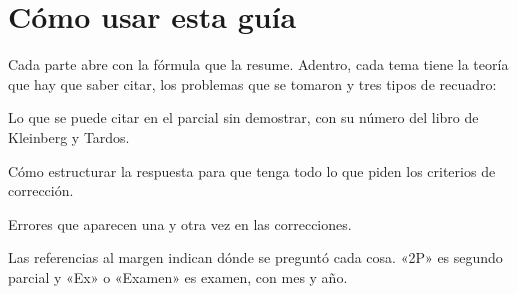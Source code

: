 \section*{Cómo usar esta guía}
Cada parte abre con la fórmula que la resume. Adentro, cada tema tiene la
teoría que hay que saber citar, los problemas que se tomaron y tres
tipos de recuadro:

\begin{resultado}
Lo que se puede citar en el parcial sin demostrar, con su número del libro de
Kleinberg y Tardos.
\end{resultado}

\begin{receta}
Cómo estructurar la respuesta para que tenga todo lo que piden los criterios
de corrección.
\end{receta}

\begin{trampa}
Errores que aparecen una y otra vez en las correcciones.
\end{trampa}

Las referencias al margen indican dónde se preguntó cada cosa. «2P» es segundo parcial y «Ex» o
«Examen» es examen, con mes y año.

\vspace{1.5em}
\tableofcontents








